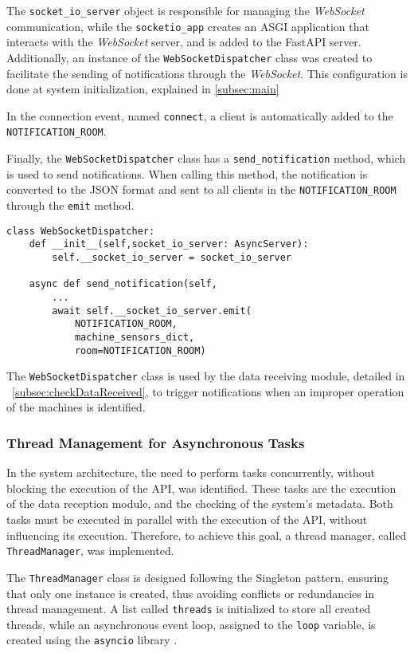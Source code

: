 The \texttt{socket\_io\_server} object is responsible for managing the \textit{WebSocket} communication, while the \texttt{socketio\_app} creates an \gls{ASGI} application that interacts with the \textit{WebSocket} server, and is added to the FastAPI server. Additionally, an instance of the \texttt{WebSocketDispatcher} class was created to facilitate the sending of notifications through the \textit{WebSocket}. This configuration is done at system initialization, explained in \ref{subsec:main}

In the connection event, named \texttt{connect}, a client is automatically added to the \texttt{NOTIFICATION\_ROOM}.

Finally, the \texttt{WebSocketDispatcher} class has a \texttt{send\_notification} method, which is used to send notifications. When calling this method, the notification is converted to the JSON format and sent to all clients in the \texttt{NOTIFICATION\_ROOM} through the \texttt{emit} method.

\begin{Verbatim}[fontsize=\small, baselinestretch=0.6]
class WebSocketDispatcher:
    def __init__(self,socket_io_server: AsyncServer):
        self.__socket_io_server = socket_io_server
    
    async def send_notification(self,
        ...
        await self.__socket_io_server.emit(
            NOTIFICATION_ROOM,
            machine_sensors_dict,
            room=NOTIFICATION_ROOM)
\end{Verbatim}

The \texttt{WebSocketDispatcher} class is used by the data receiving module, detailed in ~\ref{subsec:checkDataReceived}, to trigger notifications when an improper operation of the machines is identified.

\subsubsection{Thread Management for Asynchronous Tasks}\label{subsubsec:ThreadManager}
In the system architecture, the need to perform tasks concurrently, without blocking the execution of the \gls{API}, was identified. These tasks are the execution of the data reception module, and the checking of the system's metadata. Both tasks must be executed in parallel with the execution of the \gls{API}, without influencing its execution. Therefore, to achieve this goal, a thread manager, called \texttt{ThreadManager}, was implemented.

The \texttt{ThreadManager} class is designed following the Singleton pattern, ensuring that only one instance is created, thus avoiding conflicts or redundancies in thread management. A list called \texttt{threads} is initialized to store all created threads, while an asynchronous event loop, assigned to the \texttt{loop} variable, is created using the \texttt{asyncio} library \cite{pythonAsyncio}.

